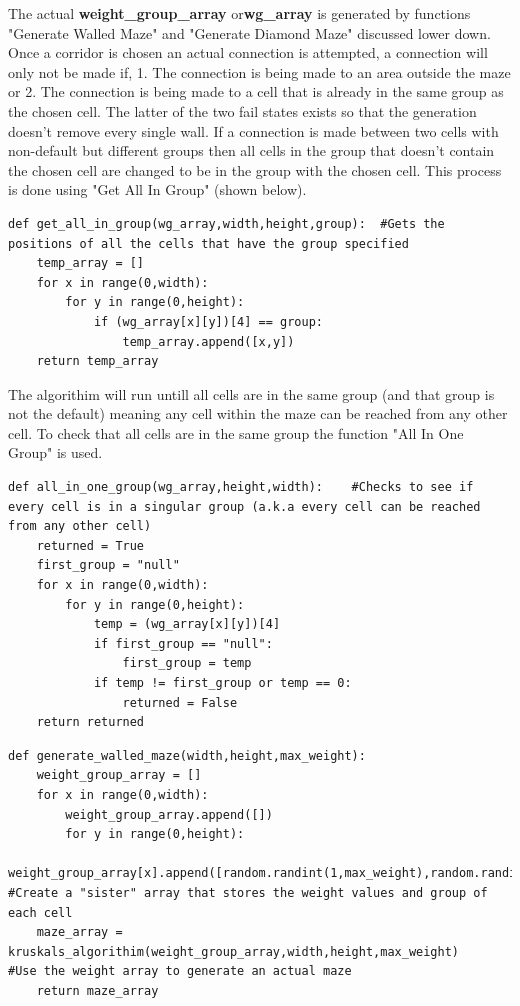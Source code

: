 \documentclass{article}
\begin{document}
The actual \textbf{weight\_group\_array} or\textbf{wg\_array}  is generated by functions "Generate Walled Maze" and "Generate Diamond Maze" discussed lower down.
Once a corridor is chosen an actual connection is attempted, a connection will only not be made if, 1. The connection is being made to an area outside the maze or 2. The
connection is being made to a cell that is already in the same group as the chosen cell. The latter of the two fail states exists so that the generation doesn't remove every single wall.
If a connection is made between two cells with non-default but different groups then all cells in the group that doesn't contain the chosen cell are changed to be in the group
with the chosen cell. This process is done using "Get All In Group" (shown below).
\begin{lstlisting}
def get_all_in_group(wg_array,width,height,group):  #Gets the positions of all the cells that have the group specified
    temp_array = []
    for x in range(0,width):
        for y in range(0,height):
            if (wg_array[x][y])[4] == group:
                temp_array.append([x,y])
    return temp_array
\end{lstlisting}
The algorithim will run untill all cells are in the same group (and that group is not the default) meaning any cell within the maze can be reached from any other cell. To check
that all cells are in the same group the function "All In One Group" is used.
\begin{lstlisting}
def all_in_one_group(wg_array,height,width):    #Checks to see if every cell is in a singular group (a.k.a every cell can be reached from any other cell)
    returned = True
    first_group = "null"
    for x in range(0,width):
        for y in range(0,height):
            temp = (wg_array[x][y])[4]
            if first_group == "null":
                first_group = temp
            if temp != first_group or temp == 0:
                returned = False                
    return returned
\end{lstlisting}
\begin{lstlisting}
def generate_walled_maze(width,height,max_weight):
    weight_group_array = []                 
    for x in range(0,width):
        weight_group_array.append([])
        for y in range(0,height):
            weight_group_array[x].append([random.randint(1,max_weight),random.randint(1,max_weight),random.randint(1,max_weight),random.randint(1,max_weight),0])   #Create a "sister" array that stores the weight values and group of each cell
    maze_array = kruskals_algorithim(weight_group_array,width,height,max_weight)    #Use the weight array to generate an actual maze
    return maze_array
\end{lstlisting}
\end{document}
